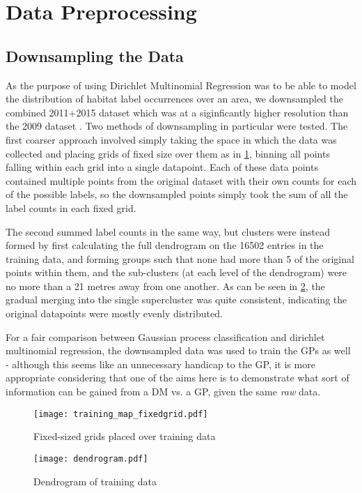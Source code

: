 \section{Data Preprocessing}

\subsection{Downsampling the Data}
As the purpose of using Dirichlet Multinomial Regression was to be able to model the distribution of habitat label occurrences over an area, we downsampled the combined 2011+2015 dataset which was at a siginficantly higher resolution than the 2009 dataset . Two methods of downsampling in particular were tested. The first coarser approach involved simply taking the space in which the data was collected and placing grids of fixed size over them as in \cref{fig:gridsplit}, binning all points falling within each grid into a single datapoint. Each of these data points contained multiple points from the original dataset with their own counts for each of the possible labels, so the downsampled points simply took the sum of all the label counts in each fixed grid. 

The second summed label counts in the same way, but clusters were instead formed by first calculating the full dendrogram on the 16502 entries in the training data, and forming groups such that none had more than 5 of the original points within them, and the sub-clusters (at each level of the dendrogram) were no more than a 21 metres away from one another. As can be seen in \cref{fig:dendrogram}, the gradual merging into the single supercluster was quite consistent, indicating the original datapoints were mostly evenly distributed.

For a fair comparison between Gaussian process classification and dirichlet multinomial regression, the downsampled data was used to train the GPs as well - although this seems like an unnecessary handicap to the GP, it is more appropriate considering that one of the aims here is to demonstrate what sort of information can be gained from a DM vs. a GP, given the same \textit{raw} data.

\begin{figure}[H]
    \texttt{[image: training\_map\_fixedgrid.pdf]}
    \caption{Fixed-sized grids placed over training data}
    \label{fig:gridsplit}
\end{figure} 
\begin{figure}[H]
    \centering
    \texttt{[image: dendrogram.pdf]}
    \caption{Dendrogram of training data}
    \label{fig:dendrogram}
\end{figure}

